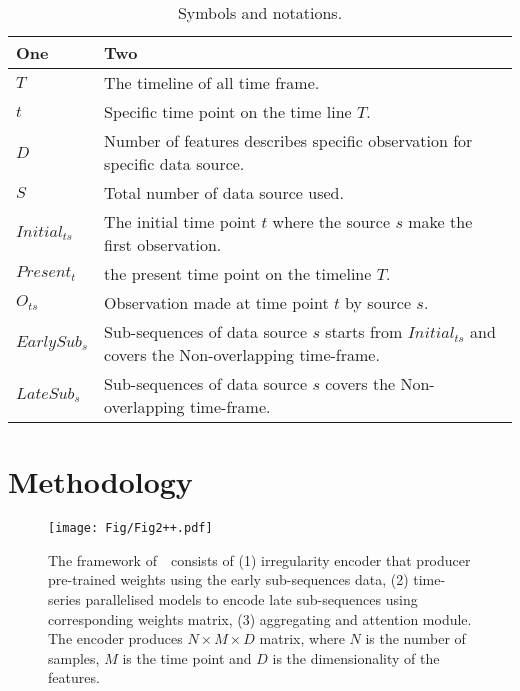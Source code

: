 \documentclass[conference]{IEEEtran}
\begin{document}
\begin{table}[!t]
\renewcommand{\arraystretch}{1.3}

\caption{Symbols and notations.}
\label{table_notation}
\centering

\begin{tabular}{|l||p{2.5in}|}
\hline
One & Two\\
\hline
$T$ & The timeline of all time frame.\\
$t$ & Specific time point on the time line $T$. \\
$D$ & Number of features describes specific observation for specific data source.\\
$S$ & Total number of data source used. \\
$Initial_{ts}$ & The initial time point $t$ where the source $s$ make the first observation. \\ 
$Present_{t}$ & the present time point on the timeline $T$. \\
$O_{ts}$ & Observation made at time point $t$ by source $s$.  \\
$EarlySub_{s}$ & Sub-sequences of data source $s$ starts from $Initial_{ts}$ and covers the Non-overlapping time-frame.\\
$LateSub_{s}$ & Sub-sequences of data source $s$ covers the Non-overlapping time-frame. \\\hline
\end{tabular}
\end{table}



\section{Methodology}
  \begin{figure*}[!t]
  \centering
  \texttt{[image: Fig/Fig2++.pdf]}
  \caption{The framework of~\name\  consists of (1) irregularity encoder that producer pre-trained weights using the early sub-sequences data, (2) time-series parallelised models to encode late sub-sequences using corresponding weights matrix, (3) aggregating and attention module.  The encoder  produces $N \times M \times D$ matrix, where  $N$ is the number of samples, $M$ is the time point and $D$ is the dimensionality of the features. }
  \label{fig:two}
  \end{figure*}
  
\end{document}
